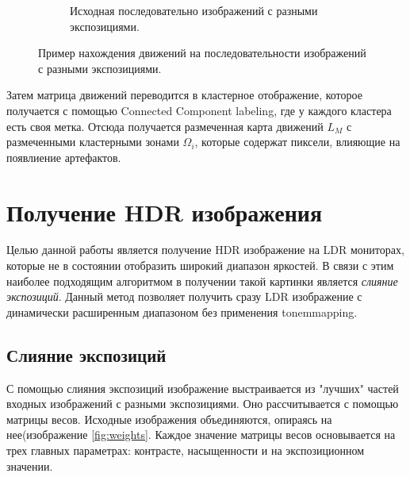 \begin{figure}[!tbp]
\begin{subfigure}{.3\textwidth}
    \caption{ Исходная последовательно изображений с разными экспозициями.}
  \end{subfigure}
  \caption { Пример нахождения движений на последовательности изображений с разными экспозициями.}
  \label{fig:bmdExample}
\end{figure}

Затем матрица движений переводится в кластерное отображение, которое получается с помощью Connected Component labeling, где у каждого кластера есть своя метка. Отсюда получается размеченная карта движений $L_M$ с размеченными кластерными зонами $\Omega_i$, которые содержат пиксели, влияющие на появлиение артефактов.

\section{ Получение HDR изображения}

Целью данной работы является получение HDR изображение на LDR мониторах, которые не в состоянии отобразить широкий диапазон яркостей. В связи с этим наиболее подходящим алгоритмом в получении такой картинки является \textit{слияние экспозиций}\cite{bib7}. Данный метод позволяет получить сразу LDR изображение с динамически расширенным диапазоном без применения tonemmapping.

\subsection { Слияние экспозиций}

С помощью слияния экспозиций изображение выстраивается из "лучших" частей входных изображений с разными экспозициями. Оно рассчитывается с помощью матрицы весов. Исходные изображения объединяются, опираясь на нее(изображение \ref{fig:weights}. Каждое значение матрицы весов основывается на трех главных параметрах: контрасте, насыщенности и на экспозиционном значении.

